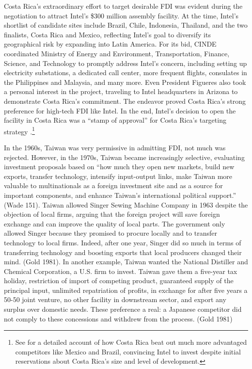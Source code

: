 Costa Rica's extraordinary effort to target desirable FDI was evident during the
negotiation to attract Intel's \$300 million assembly facility. At the time,
Intel's shortlist of candidate sites include Brazil, Chile, Indonesia, Thailand,
and the two finalists, Costa Rica and Mexico, reflecting Intel's goal to
diversify its geographical risk by expanding into Latin America. For its bid,
CINDE coordinated Ministry of Energy and Environment, Transportation, Finance,
Science, and Technology to promptly address Intel's concern, including setting
up electricity substations, a dedicated call center, more frequent flights,
consulates in the Philippines and Malaysia, and many more. Even President
Figueres also took a personal interest in the project, traveling to Intel
headquarters in Arizona to demonstrate Costa Rica's commitment. The endeavor
proved Costa Rica's strong preference for high-tech FDI like Intel. In the end,
Intel's decision to open the facility in Costa Rica was a ``stamp of approval''
for Costa Rica's targeting strategy \citep[511]{Mortimore2004}.\footnote{See
  \citet{Spar1998} for a detailed account of how Costa Rica beat out much more
  advantaged competitors like Mexico and Brazil, convincing Intel to invest
  despite initial reservations about Costa Rica's size and level of
  development.}

In the 1960s, Taiwan was very permissive in admitting FDI, not much was
rejected. However, in the 1970s, Taiwan became increasingly selective,
evaluating investment proposals based on ``how much they open new markets, build
new exports, transfer technology, intensify input-output links, make Taiwan more
valuable to multinationals as a foreign investment site and as a source for
important components, and enhance Taiwan's international political support.''
(Wade 151). Taiwan allowed Singer Sewing Machine Company in 1963 despite the
objection of local firms, arguing that the foreign project will save foreign
exchange and can improve the quality of local parts. The government only allowed
Singer because they promised to procure locally and to transfer technology to
local firms. Indeed, after one year, Singer did so much in terms of transferring
technology and boosting exports that local producers changed their mind. (Gold
1981). In another example, Taiwan wanted the National Distiller and Chemical
Corporation, a U.S. firm to invest. Taiwan gave them a five-year tax holiday,
restriction of import of competing product, guaranteed supply of the principal
input, unlimited repatriation of profits, in exchange for after five years a
50-50 joint venture, no other facility in downstream sector, and export any
surplus over domestic needs. These preference a real: a Japanese competitor did
not comply to these concessions and withdrew from the process. (Gold 1981)

